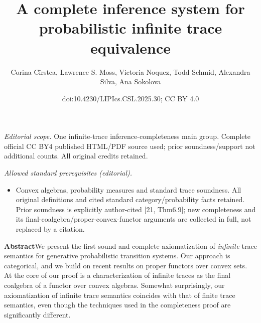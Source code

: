 \documentclass[11pt,a4paper]{amsart}
\title{A complete inference system for probabilistic infinite trace equivalence}
\author{Corina Cîrstea, Lawrence S. Moss, Victoria Noquez, Todd Schmid, Alexandra Silva, Ana Sokolova}
\date{doi:10.4230/LIPIcs.CSL.2025.30; CC BY 4.0}
\begin{document}
\maketitle
\noindent\textit{Editorial scope.} One infinite-trace inference-completeness main group. Complete official CC BY4 published HTML/PDF source used; prior soundness/support not additional counts. All original credits retained.\par\medskip
\noindent\textit{Allowed standard prerequisites (editorial).}\begin{itemize}
\item Convex algebras, probability measures and standard trace soundness. All original definitions and cited standard category/probability facts retained. Prior soundness is explicitly author-cited [21, Thm6.9]; new completeness and its final-coalgebra/proper-convex-functor arguments are collected in full, not replaced by a citation.
\end{itemize}\medskip
%
\hypertarget{html:abstract}{} \par\noindent\textbf{Abstract}\quad  We present the first sound and complete axiomatization of \emph{infinite} trace semantics for generative probabilistic transition systems. Our approach is categorical, and we build on recent results on proper functors over convex sets. At the core of our proof is a characterization of infinite traces as the final coalgebra of a functor over convex algebras. Somewhat surprisingly, our axiomatization of infinite trace semantics coincides with that of finite trace semantics, even though the techniques used in the completeness proof are significantly different.
\par\medskip
 
\end{document}
